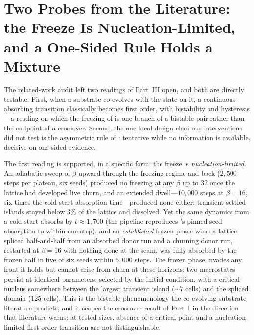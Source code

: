 \section{Two Probes from the Literature: the Freeze Is Nucleation-Limited, and a One-Sided Rule Holds a Mixture}
\label{sec:probes}

The related-work audit left two readings of Part~III open, and both are
directly testable. First, when a substrate co-evolves with the state on it,
a continuous absorbing transition classically becomes first order, with
bistability and hysteresis \parencite{gross2006epidemic}---a reading on
which the freezing of  is one branch of a bistable
pair rather than the endpoint of a crossover. Second, the one local design
class our interventions did not test is the asymmetric rule of
\textcite{droste2013analytical}: tentative while no information is
available, decisive on one-sided evidence.

The first reading is supported, in a specific form: the freeze is
\emph{nucleation-limited}. An adiabatic sweep of $\beta$ upward through the
freezing regime and back ($2{,}500$ steps per plateau, six seeds) produced
no freezing at any $\beta$ up to $32$ once the lattice had developed live
churn, and an extended dwell---$10{,}000$ steps at $\beta = 16$, six times
the cold-start absorption time---produced none either: transient settled
islands stayed below $3\%$ of the lattice and dissolved. Yet the same
dynamics from a cold start absorbs by $t \approx 1{,}700$ (the pipeline
reproduces 's pinned-seed absorption to within one
step), and an \emph{established} frozen phase wins: a lattice spliced
half-and-half from an absorbed donor run and a churning donor run, restarted
at $\beta = 16$ with nothing done at the seam, was fully absorbed by the
frozen half in five of six seeds within $5{,}000$ steps. The frozen phase
invades any front it holds but cannot arise from churn at these horizons:
two macrostates persist at identical parameters, selected by the initial
condition, with a critical nucleus somewhere between the largest transient
island ($\sim$$7$ cells) and the spliced domain ($125$ cells). This is the
bistable phenomenology the co-evolving-substrate literature predicts, and it
scopes the crossover result of Part~I in the direction that literature
warns: at tested sizes, absence of a critical point and a
nucleation-limited first-order transition are not distinguishable.


